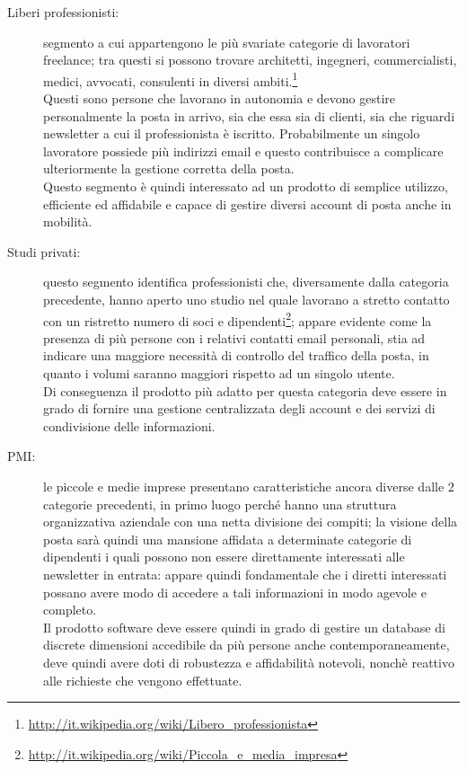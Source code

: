 \begin{description}
\item[Liberi professionisti:] segmento a cui appartengono le più svariate categorie di lavoratori freelance; tra questi si possono trovare architetti, ingegneri, commercialisti, medici, avvocati, consulenti in diversi ambiti.\footnote{\url{http://it.wikipedia.org/wiki/Libero\_professionista}}\\
Questi sono persone che lavorano in autonomia e devono gestire personalmente la posta in arrivo, sia che essa sia di clienti, sia che riguardi newsletter a cui il professionista è iscritto. Probabilmente un singolo lavoratore possiede più indirizzi email e questo contribuisce a complicare ulteriormente la gestione corretta della posta.\\
Questo segmento è quindi interessato ad un prodotto di semplice utilizzo, efficiente ed affidabile e capace di gestire diversi account di posta anche in mobilità.
\item[Studi privati:] questo segmento identifica professionisti che, diversamente dalla categoria precedente, hanno aperto uno studio nel quale lavorano a stretto contatto con un ristretto numero di soci e dipendenti\footnote{\url{http://it.wikipedia.org/wiki/Piccola\_e\_media\_impresa}}; appare evidente come la presenza di più persone con i relativi contatti email personali, stia ad indicare una maggiore necessità di controllo del traffico della posta, in quanto i volumi saranno maggiori rispetto ad un singolo utente.\\
Di conseguenza il prodotto più adatto per questa categoria deve essere in grado di fornire una gestione centralizzata degli account e dei servizi di condivisione delle informazioni.
\item[PMI:] le piccole e medie imprese presentano caratteristiche ancora diverse dalle 2 categorie precedenti, in primo luogo perché hanno una struttura organizzativa aziendale con una netta divisione dei compiti; la visione della posta sarà quindi una mansione affidata a determinate categorie di dipendenti i quali possono non essere direttamente interessati alle newsletter in entrata: appare quindi fondamentale che i diretti interessati possano avere modo di accedere a tali informazioni in modo agevole e completo.\\
Il prodotto software deve essere quindi in grado di gestire un database di discrete dimensioni accedibile da più persone anche contemporaneamente, deve quindi avere doti di robustezza e affidabilità notevoli, nonchè reattivo alle richieste che vengono effettuate.
\end{description}

